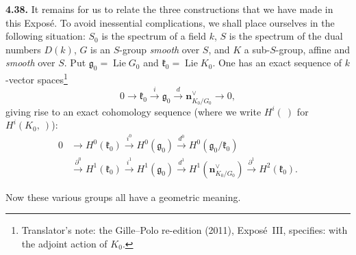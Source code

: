 \medskip
\noindent{}\textbf{4.38.}
It remains for us to relate the three constructions that we have made in
this Expos\'e. To avoid inessential complications, we shall place
ourselves in the following situation: \(S_0\) is the spectrum of a field
\(k\), \(S\) is the spectrum of the dual numbers \(D(k)\), \(G\) is an
\(S\)-group \emph{smooth} over \(S\), and \(K\) a sub-\(S\)-group, affine and
\emph{smooth} over \(S\). Put \(\mathfrak g_0=\operatorname{Lie}G_0\) and
\(\mathfrak k_0=\operatorname{Lie}K_0\). One has an exact sequence of
\(k\)-vector spaces\footnote{Translator's note: the Gille--Polo re-edition (2011), Exposé~III, specifies: with the
adjoint action of \(K_0\).}
\[
 0\longrightarrow\mathfrak k_0
 \xrightarrow{\ i\ }\mathfrak g_0
 \xrightarrow{\ d\ }\mathbf n^{\vee}_{K_0/G_0}
 \longrightarrow 0,
\]
giving rise to an exact cohomology sequence (where we write \(H^i(\ )\) for
\(H^i(K_0,\ )\)):
\[
\begin{aligned}
0&\longrightarrow H^0(\mathfrak k_0)
 \xrightarrow{\ i^0\ }H^0(\mathfrak g_0)
 \xrightarrow{\ d^0\ }H^0(\mathfrak g_0/\mathfrak k_0)\\
&\xrightarrow{\ \partial^0\ }H^1(\mathfrak k_0)
 \xrightarrow{\ i^1\ }H^1(\mathfrak g_0)
 \xrightarrow{\ d^1\ }H^1(\mathbf n^{\vee}_{K_0/G_0})
 \xrightarrow{\ \partial^1\ }H^2(\mathfrak k_0).
\end{aligned}
\]

Now these various groups all have a geometric meaning.

